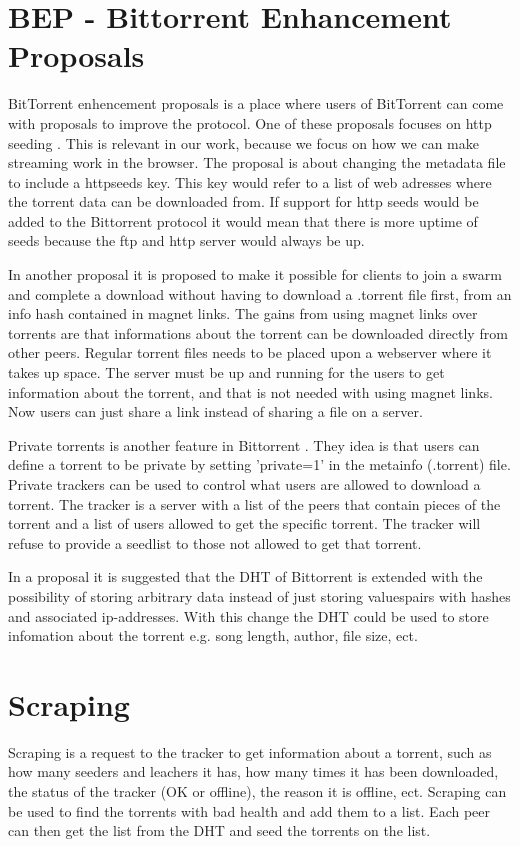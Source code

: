\section{BEP - Bittorrent Enhancement Proposals}
BitTorrent enhencement proposals is a place where users of BitTorrent can come with proposals to improve the protocol.
One of these proposals focuses on http seeding \citep{bittorrent:bep17}.
This is relevant in our work, because we focus on how we can make streaming work in the browser. The proposal is about changing the metadata file to include a httpseeds key. This key would refer to a list of web adresses where the torrent data can be downloaded from.
If support for http seeds would be added to the Bittorrent protocol it would mean that there is more uptime of seeds because the ftp and http server would always be up.

In another proposal \citep{bittorrent:bep09} it is proposed to make it possible for clients to join a swarm and complete a download without having to download a .torrent file first, from an info hash contained in magnet links. The gains from using magnet links over torrents are that informations about the torrent can be downloaded directly from other peers. Regular torrent files needs to be placed upon a webserver where it takes up space. The server must be up and running for the users to get information about the torrent, and that is not needed with using magnet links.
Now users can just share a link instead of sharing a file on a server.

Private torrents is another feature in Bittorrent \citep{bittorrent:bep27}. They idea is that users can define a torrent to be private by setting 'private=1' in the metainfo (.torrent) file. Private trackers can be used to control what users are allowed to download a torrent. The tracker is a server with a list of the peers that contain pieces of the torrent and a list of users allowed to get the specific torrent.
The tracker will refuse to provide a seedlist to those not allowed to get that torrent.

In a proposal \citep{bittorrent:bep44} it is suggested that the \acs{DHT} of Bittorrent is extended with the possibility of storing arbitrary data instead of just storing valuespairs with hashes and associated ip-addresses.
With this change the \acs{DHT} could be used to store infomation about the torrent e.g. song length, author, file size, ect.

\section{Scraping}
Scraping is a request to the tracker to get information about a torrent, such as how many seeders and leachers it has, how many times it has been downloaded, the status of the tracker (OK or offline), the reason it is offline, ect.
Scraping can be used to find the torrents with bad health and add them to a list. Each peer can then get the list from the \acs{DHT} and seed the torrents on the list.
